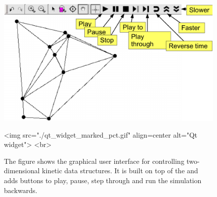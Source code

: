\begin{figure}
\begin{ccTexOnly}
\begin{center}
\includegraphics[scale=.5]{Kinetic_data_structures/qt_widget_marked_pct}
\end{center}
\end{ccTexOnly}
\begin{ccHtmlOnly}
<img src="./qt_widget_marked_pct.gif" align=center alt="Qt widget"> <br>
\end{ccHtmlOnly}
\caption{\label{fig:kds_qtwidget_capture} The figure shows the graphical user interface for
  controlling two-dimensional kinetic data structures. It is built on
  top of the  and adds buttons to play, pause, step
  through and run the simulation backwards.}
\end{figure}
